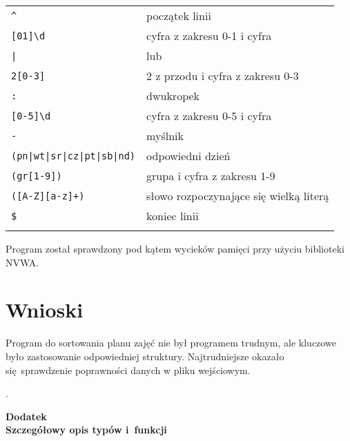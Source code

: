 \documentclass[12pt,a4paper,twoside]{article}
\let\oldmarginpar\marginpar
\renewcommand\marginpar[1]{%
  {\linespread{0.85}\normalfont\scriptsize%
\oldmarginpar[\hspace{1cm}\begin{minipage}{3cm}\raggedleft\scriptsize\color{black}\textsf{#1}\end{minipage}]%
{\hspace{0cm}\begin{minipage}{3cm}\raggedright\scriptsize\color{black}\textsf{#1}\end{minipage}}%
}%
}
\begin{document}
\begin{tabular}{ll}
	\toprule
	\verb/^/                       & początek linii    \\
	\verb/[01]\d/                  & cyfra z zakresu 0-1 i cyfra  \\
	\verb/|/             & lub         \\
	\verb/2[0-3]/                    & 2 z przodu i cyfra z zakresu 0-3            \\
	\verb/:/             & dwukropek                    \\
	\verb/[0-5]\d/                     & cyfra z zakresu 0-5 i cyfra                     \\
	\verb/-/ 				& myślnik \\
	\verb/(pn|wt|sr|cz|pt|sb|nd)/         & odpowiedni dzień \\
	\verb/(gr[1-9])/                     & grupa i cyfra z zakresu 1-9                    \\
	\verb/([A-Z][a-z]+)/ & słowo rozpoczynające się wielką literą             \\
	\verb/$/ 			& koniec linii             \\
	\bottomrule
	                            &
\end{tabular}

Program został sprawdzony pod kątem wycieków pamięci przy użyciu biblioteki NVWA.

%



\section{Wnioski}
\marginpar{}
Program do sortowania planu zajęć nie był programem trudnym, ale kluczowe było zastosowanie odpowiedniej struktury. Najtrudniejsze okazało się sprawdzenie poprawności danych w pliku wejściowym. 

 
\begin{filecontents}{bibliografia.bib}

}
\end{filecontents}


\cite{id:Cormen2001Wprowadzenie}.




 
\cleardoublepage

\rule{0cm}{0cm}

\vfill

\begin{center}
\Huge\bfseries Dodatek\\Szczegółowy opis typów i~funkcji\par
\end{center}

\vfill 

\rule{0cm}{0cm}
\end{document}
